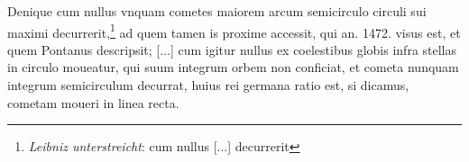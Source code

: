 \pend \pstart [p.~192] Denique cum nullus vnquam cometes\protect{} maiorem arcum\protect{} semicirculo circuli sui maximi decurrerit,\footnote{\textit{Leibniz unterstreicht}: cum nullus [...] decurrerit} ad quem tamen is proxime accessit, qui an. 1472. visus est, et quem Pontanus\protect{}  descripsit; [...] cum igitur nullus ex coelestibus globis infra stellas\protect{} in circulo moueatur, qui suum integrum  orbem non conficiat, et cometa\protect{} nunquam integrum semicirculum decurrat, huius rei germana ratio est, si dicamus, cometam\protect{} moueri in linea recta.